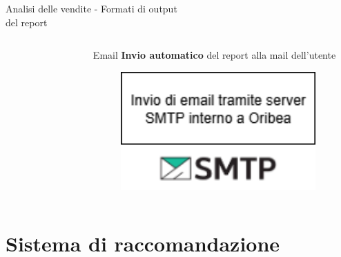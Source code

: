 \documentclass{beamer}
\begin{document}
\begin{frame}{Analisi delle vendite - Formati di output\\ del report}
\begin{columns}
\begin{column}{0.33\textwidth}
\begin{figure}
						\end{figure}
					\end{column}
					\begin{column}{0.33\textwidth}
						\begin{block}{Email}
							\textbf{Invio automatico} del report alla mail dell'utente
						\end{block}
						\begin{figure}
							\centering
							\includegraphics[width=0.95\textwidth]{Diagramma invio report via mail SMTP.png}
						\end{figure}
					\end{column}
				\end{columns}
	\end{frame}


	\section{Sistema di raccomandazione}
\end{document}
